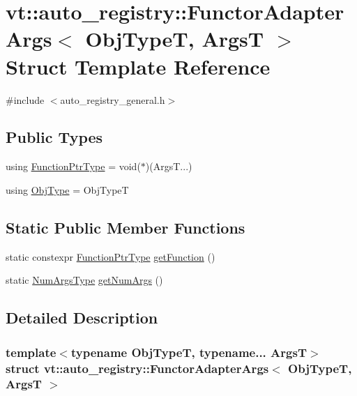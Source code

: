 \hypertarget{structvt_1_1auto__registry_1_1_functor_adapter_args}{}\section{vt\+:\+:auto\+\_\+registry\+:\+:Functor\+Adapter\+Args$<$ Obj\+TypeT, ArgsT $>$ Struct Template Reference}
\label{structvt_1_1auto__registry_1_1_functor_adapter_args}


{\ttfamily \#include $<$auto\+\_\+registry\+\_\+general.\+h$>$}

\subsection*{Public Types}
\begin{DoxyCompactItemize}
\item 
using \hyperlink{structvt_1_1auto__registry_1_1_functor_adapter_args_a8845389dd3d7c6686f20764a077d1337}{Function\+Ptr\+Type} = void($\ast$)(Args\+T...)
\item 
using \hyperlink{structvt_1_1auto__registry_1_1_functor_adapter_args_ad081c757043c3f9a340c09e1d66822fa}{Obj\+Type} = Obj\+TypeT
\end{DoxyCompactItemize}
\subsection*{Static Public Member Functions}
\begin{DoxyCompactItemize}
\item 
static constexpr \hyperlink{structvt_1_1auto__registry_1_1_functor_adapter_args_a8845389dd3d7c6686f20764a077d1337}{Function\+Ptr\+Type} \hyperlink{structvt_1_1auto__registry_1_1_functor_adapter_args_a9652984336f3dcc10449d979614c5a00}{get\+Function} ()
\item 
static \hyperlink{namespacevt_1_1auto__registry_aebda1d9d765bc9147dc654ad0712c936}{Num\+Args\+Type} \hyperlink{structvt_1_1auto__registry_1_1_functor_adapter_args_ae13e4cf7fdf72608dd681cc55d26c63f}{get\+Num\+Args} ()
\end{DoxyCompactItemize}


\subsection{Detailed Description}
\subsubsection*{template$<$typename Obj\+TypeT, typename... ArgsT$>$\newline
struct vt\+::auto\+\_\+registry\+::\+Functor\+Adapter\+Args$<$ Obj\+Type\+T, Args\+T $>$}

